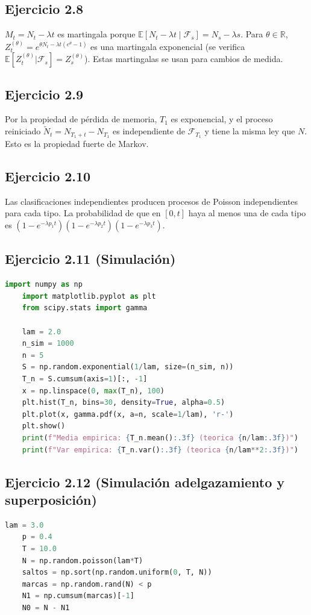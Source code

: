 \documentclass[letterpaper, 12pt]{article}
\newcommand{\E}{\mathbb{E}}
\newcommand{\R}{\mathbb{R}}
\newcommand{\F}{\mathcal{F}}
\newcommand{\1}{\mathbbm{1}}
\begin{document}
    \subsection{Ejercicio 2.8}
    $M_t=N_t-\lambda t$ es martingala porque $\E[N_t-\lambda t\mid\F_s]=N_s-\lambda s$. Para $\theta\in\R$, $Z_t^{(\theta)}=e^{\theta N_t-\lambda t(e^\theta-1)}$ es una martingala exponencial (se verifica $\E[Z_t^{(\theta)}|\F_s]=Z_s^{(\theta)}$). Estas martingalas se usan para cambios de medida.

    \subsection{Ejercicio 2.9}
    Por la propiedad de p\'erdida de memoria, $T_1$ es exponencial, y el proceso reiniciado $\tilde{N}_t=N_{T_1+t}-N_{T_1}$ es independiente de $\F_{T_1}$ y tiene la misma ley que $N$. Esto es la propiedad fuerte de Markov.

    \subsection{Ejercicio 2.10}
    Las clasificaciones independientes producen procesos de Poisson independientes para cada tipo. La probabilidad de que en $[0,t]$ haya al menos una de cada tipo es $(1-e^{-\lambda p_1t})(1-e^{-\lambda p_2t})(1-e^{-\lambda p_3t})$.

    \subsection{Ejercicio 2.11 (Simulaci\'on)}
    \begin{lstlisting}[language=Python]
    import numpy as np
    import matplotlib.pyplot as plt
    from scipy.stats import gamma

    lam = 2.0
    n_sim = 1000
    n = 5
    S = np.random.exponential(1/lam, size=(n_sim, n))
    T_n = S.cumsum(axis=1)[:, -1]
    x = np.linspace(0, max(T_n), 100)
    plt.hist(T_n, bins=30, density=True, alpha=0.5)
    plt.plot(x, gamma.pdf(x, a=n, scale=1/lam), 'r-')
    plt.show()
    print(f"Media empirica: {T_n.mean():.3f} (teorica {n/lam:.3f})")
    print(f"Var empirica: {T_n.var():.3f} (teorica {n/lam**2:.3f})")
    \end{lstlisting}

    \subsection{Ejercicio 2.12 (Simulaci\'on adelgazamiento y superposici\'on)}
    \begin{lstlisting}[language=Python]
    lam = 3.0
    p = 0.4
    T = 10.0
    N = np.random.poisson(lam*T)
    saltos = np.sort(np.random.uniform(0, T, N))
    marcas = np.random.rand(N) < p
    N1 = np.cumsum(marcas)[-1]
    N0 = N - N1
    \end{lstlisting}
\end{document}
